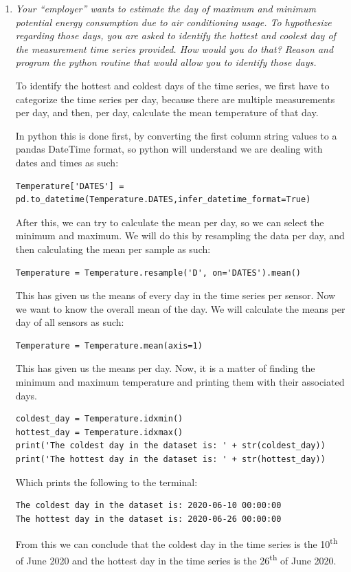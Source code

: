 \documentclass[a4paper,12pt]{article} %
\begin{document}
\begin{enumerate}
\item{\it Your “employer” wants to estimate the day of maximum and minimum potential energy consumption due to air conditioning usage. To hypothesize regarding those days, you are asked to identify the hottest and coolest day of the measurement time series provided. How would you do that? Reason and program the python routine that would allow you to identify those days.}

To identify the hottest and coldest days of the time series, we first have to categorize the time series per day, because there are multiple measurements per day, and then, per day, calculate the mean temperature of that day. 

In python this is done first, by converting the first column string values to a pandas DateTime format, so python will understand we are dealing with dates and times as such: 
\begin{lstlisting}[breaklines]
Temperature['DATES'] = pd.to_datetime(Temperature.DATES,infer_datetime_format=True)
\end{lstlisting}
After this, we can try to calculate the mean per day, so we can select the minimum and maximum. We will do this by resampling the data per day, and then calculating the mean per sample as such:
\begin{lstlisting}[breaklines]
Temperature = Temperature.resample('D', on='DATES').mean()
\end{lstlisting}
This has given us the means of every day in the time series per sensor. Now we want to know the overall mean of the day. We will calculate the means per day of all sensors as such:
\begin{lstlisting}[breaklines]
Temperature = Temperature.mean(axis=1)
\end{lstlisting}
This has given us the means per day. Now, it is a matter of finding the minimum and maximum temperature and printing them with their associated days. 
\begin{lstlisting}[breaklines]
coldest_day = Temperature.idxmin()
hottest_day = Temperature.idxmax()
print('The coldest day in the dataset is: ' + str(coldest_day))
print('The hottest day in the dataset is: ' + str(hottest_day))
\end{lstlisting}
Which prints the following to the terminal:
\begin{lstlisting}[breaklines]
The coldest day in the dataset is: 2020-06-10 00:00:00
The hottest day in the dataset is: 2020-06-26 00:00:00
\end{lstlisting}
From this we can conclude that the coldest day in the time series is the 10\textsuperscript{th} of June 2020 and the hottest day in the time series is the 26\textsuperscript{th} of June 2020.  
\end{enumerate}
\printbibliography
\end{document}
